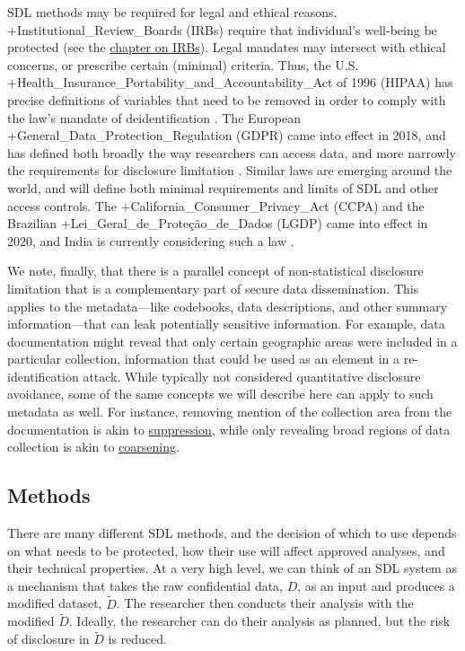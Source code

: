 \documentclass[
]{WileySix}
\begin{document}
SDL methods may be required for legal and ethical reasons. +Institutional\_Review\_Boards\textbar{} (IRBs) require that individual's well-being be protected (see the \protect\hyperlink{irb}{chapter on IRBs}). Legal mandates may intersect with ethical concerns, or prescribe certain (minimal) criteria. Thus, the U.S. +Health\_Insurance\_Portability\_and\_Accountability\_Act\textbar{} of 1996 (HIPAA) \citep{us_department_of_health__human_services_health_nodate} has precise definitions of variables that need to be removed in order to comply with the law's mandate of deidentification \citep{department_of_health_and_human_services_methods_2012}. The European +General\_Data\_Protection\_Regulation\textbar{} (GDPR) came into effect in 2018, and has defined both broadly the way researchers can access data, and more narrowly the requirements for disclosure limitation \citep{cohen_towards_2020, greene_adjusting_2019, molnar-gabor_germany_2018}. Similar laws are emerging around the world, and will define both minimal requirements and limits of SDL and other access controls. The +California\_Consumer\_Privacy\_Act\textbar{} (CCPA) \citep{marini_comparing_2018} and the Brazilian +Lei\_Geral\_de\_Proteção\_de\_Dados\textbar{} (LGDP) \citep{black_6_2020} came into effect in 2020, and India is currently considering such a law \citep{panakal_indias_2019}.

We note, finally, that there is a parallel concept of non-statistical disclosure limitation that is a complementary part of secure data dissemination. This applies to the metadata---like codebooks, data descriptions, and other summary information---that can leak potentially sensitive information. For example, data documentation might reveal that only certain geographic areas were included in a particular collection, information that could be used as an element in a re-identification attack. While typically not considered quantitative disclosure avoidance, some of the same concepts we will describe here can apply to such metadata as well. For instance, removing mention of the collection area from the documentation is akin to \protect\hyperlink{suppression}{suppression}, while only revealing broad regions of data collection is akin to \protect\hyperlink{coarsening}{coarsening}.

\hypertarget{methods}{%
\subsection{Methods}\label{methods}}

There are many different SDL methods, and the decision of which to use depends on what needs to be protected, how their use will affect approved analyses, and their technical properties. At a very high level, we can think of an SDL system as a mechanism that takes the raw confidential data, \(D\), as an input and produces a modified dataset, \(\tilde{D}\). The researcher then conducts their analysis with the modified \(\tilde{D}\). Ideally, the researcher can do their analysis as planned, but the risk of disclosure in \(\tilde{D}\) is reduced.
\end{document}
